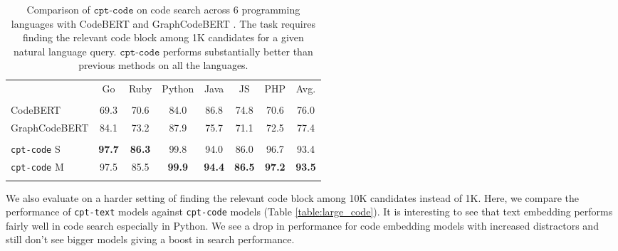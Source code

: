 \documentclass[nohyperref]{article}
\begin{document}
\begin{table}[]
\small
\setlength{\tabcolsep}{4pt}
\centering
\tabcolsep=0.105cm
\begin{tabular}{lccccccc}
& Go & Ruby & Python & Java & JS & PHP & Avg. \\
\Xhline{2.5\arrayrulewidth} \\[-1.5ex]
\small{CodeBERT} & 69.3 & 70.6 & 84.0 & 86.8 & 74.8 & 70.6 & 76.0 \\
\small{GraphCodeBERT} & 84.1 & 73.2 & 87.9 & 75.7 & 71.1 & 72.5 & 77.4 \\
\Xhline{1\arrayrulewidth}  \\[-1.5ex]
\texttt{cpt-code} S & \textbf{97.7} & \textbf{86.3} & 99.8 & 94.0 & 86.0 & 96.7 & 93.4 \\
\texttt{cpt-code} M & 97.5 & 85.5 & \textbf{99.9} & \textbf{94.4} & \textbf{86.5} & \textbf{97.2} & \textbf{93.5} \\
\Xhline{2.5\arrayrulewidth}
\end{tabular}
\caption{Comparison of $\texttt{cpt-code}$ on code search across 6 programming languages \cite{codesearchnet} with CodeBERT \cite{codebert} and GraphCodeBERT \cite{Guo}. The task requires finding the relevant code block among 1K candidates for a given natural language query. $\texttt{cpt-code}$ performs substantially better than previous methods on all the languages.}
\label{table:code}
\end{table}

We also evaluate on a harder setting of finding the relevant code block among 10K candidates instead of 1K. Here, we compare the performance of \texttt{cpt-text} models against \texttt{cpt-code} models (Table \ref{table:large_code}). It is interesting to see that text embedding performs fairly well in code search especially in Python. We see a drop in performance for code embedding models with increased distractors and still don’t see bigger models giving a boost in search performance. 
\end{document}
